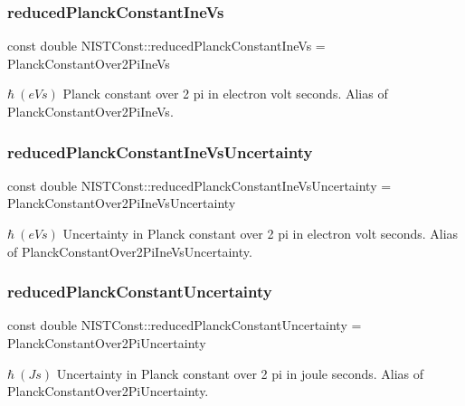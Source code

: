 \subsubsection{\texorpdfstring{reduced\+Planck\+Constant\+Ine\+Vs}{reducedPlanckConstantIneVs}}
{\footnotesize\ttfamily const double N\+I\+S\+T\+Const\+::reduced\+Planck\+Constant\+Ine\+Vs = Planck\+Constant\+Over2\+Pi\+Ine\+Vs}

$\hbar \ (eV s)$ Planck constant over 2 pi in electron volt seconds. Alias of Planck\+Constant\+Over2\+Pi\+Ine\+Vs. \mbox{\label{group___n_i_s_t_const-_planck_constant_ga90ccf5a0925f9ffdf8c289a7f2155482}} 
\subsubsection{\texorpdfstring{reduced\+Planck\+Constant\+Ine\+Vs\+Uncertainty}{reducedPlanckConstantIneVsUncertainty}}
{\footnotesize\ttfamily const double N\+I\+S\+T\+Const\+::reduced\+Planck\+Constant\+Ine\+Vs\+Uncertainty = Planck\+Constant\+Over2\+Pi\+Ine\+Vs\+Uncertainty}

$\hbar \ (eV s)$ Uncertainty in Planck constant over 2 pi in electron volt seconds. Alias of Planck\+Constant\+Over2\+Pi\+Ine\+Vs\+Uncertainty. \mbox{\label{group___n_i_s_t_const-_planck_constant_ga723312692d243868ce31c9ac7172cab9}} 
\subsubsection{\texorpdfstring{reduced\+Planck\+Constant\+Uncertainty}{reducedPlanckConstantUncertainty}}
{\footnotesize\ttfamily const double N\+I\+S\+T\+Const\+::reduced\+Planck\+Constant\+Uncertainty = Planck\+Constant\+Over2\+Pi\+Uncertainty}

$\hbar \ (J s)$ Uncertainty in Planck constant over 2 pi in joule seconds. Alias of Planck\+Constant\+Over2\+Pi\+Uncertainty. 